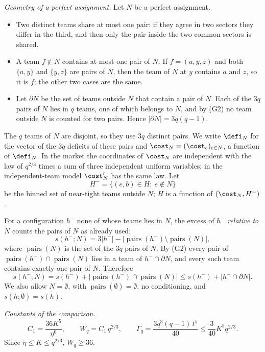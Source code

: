 \emph{Geometry of a perfect assignment.} Let $N$ be a perfect assignment.
\begin{itemize}
\item[(G1)] Two distinct teams share at most one pair: if they agree in two sectors they
differ in the third, and then only the pair inside the two common sectors is shared.
\item[(G2)] A team $f\notin N$ contains at most one pair of $N$. If $f=(a,y,z)$ and both
$\{a,y\}$ and $\{y,z\}$ are pairs of $N$, then the team of $N$ at $y$ contains $a$ and $z$, so
it is $f$; the other two cases are the same.
\item[(G3)] Let $\partial N$ be the set of teams outside $N$ that contain a pair of $N$. Each
of the $3q$ pairs of $N$ lies in $q$ teams, one of which belongs to $N$, and by (G2) no team
outside $N$ is counted for two pairs. Hence $|\partial N|=3q(q-1)$.
\end{itemize}
The $q$ teams of $N$ are disjoint, so they use $3q$ distinct pairs. We write $\defi_N$ for the
vector of the $3q$ deficits of these pairs and $\cost_N=(\cost_e)_{e\in N}$, a function of
$\defi_N$. In the market the coordinates of $\cost_N$ are independent with the law of
$q^{2/3}$ times a sum of three independent uniform variables; in the independent-team model
$\cost'_N$ has the same law. Let
\[
H^-=\{(e,b)\in H:\ e\notin N\}
\]
be the binned set of near-tight teams outside $N$; $H$ is a function of $(\cost_N,H^-)$.

For a configuration $h^-$ none of whose teams lies in $N$, the excess of $h^-$ \emph{relative
to} $N$ counts the pairs of $N$ as already used:
\[
s(h^-;N)=3|h^-|-\bigl|\operatorname{pairs}(h^-)\setminus\operatorname{pairs}(N)\bigr| ,
\]
where $\operatorname{pairs}(N)$ is the set of the $3q$ pairs of $N$. By (G2) every pair of
$\operatorname{pairs}(h^-)\cap\operatorname{pairs}(N)$ lies in a team of $h^-\cap\partial N$,
and every such team contains exactly one pair of $N$. Therefore
\begin{equation}\label{eq:transfer-excess-touch}
s(h^-;N)=s(h^-)+\bigl|\operatorname{pairs}(h^-)\cap\operatorname{pairs}(N)\bigr|
\le s(h^-)+|h^-\cap\partial N| .
\end{equation}
We also allow $N=\emptyset$, with $\operatorname{pairs}(\emptyset)=\emptyset$, no conditioning,
and $s(h;\emptyset)=s(h)$.

\emph{Constants of the comparison.}
\begin{equation}\label{eq:transfer-constants}
C_1=\frac{36K^5}{\eta^6},\qquad W_q=C_1\,q^{2/3},\qquad
\Gamma_q=\frac{3q^3(q-1)\,t^5}{40}\le\frac{3}{40}K^5q^{2/3}.
\end{equation}
Since $\eta\le K\le q^{2/3}$, $W_q\ge36$.

